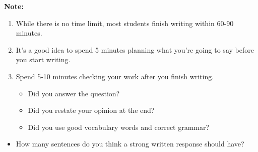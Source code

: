 \documentclass[12pt]{article}
\begin{document}
\vspace{1em}
\begin{tcolorbox}[colframe=black!40, colback=gray!5, 
coltitle=black, colbacktitle=black!20, fonttitle=\bfseries\Large, 
title=Additional Notes, halign title=center, left=5pt, right=5pt, top=5pt, bottom=15pt]
\textbf{Note:}
\begin{enumerate}
    \item While there is no time limit, most students finish writing within 60-90 minutes. 
    \item It's a good idea to spend 5 minutes planning what you're going to say before you start writing.
    \item Spend 5-10 minutes checking your work after you finish writing. 
    \begin{itemize}
        \item Did you answer the question?
        \item Did you restate your opinion at the end?
        \item Did you use good vocabulary words and correct grammar?
    \end{itemize}



\end{enumerate}
\end{tcolorbox}

\vspace{1em}

\begin{tcolorbox}[colframe=black!60, colback=white, 
coltitle=black, colbacktitle=black!15, fonttitle=\bfseries\Large, 
title=Exit Ticket, halign title=center, left=10pt, right=10pt, top=10pt, bottom=15pt]

\begin{itemize}
    \item How many sentences do you think a strong written response should have? 

\vspace{2em}

     \underline{\hspace{14.6cm}}  
    \\[0.8cm] \underline{\hspace{14.6cm}}  
    \\[0.8cm] \underline{\hspace{14.6cm}}

\end{itemize}
\end{tcolorbox}
\end{document}
